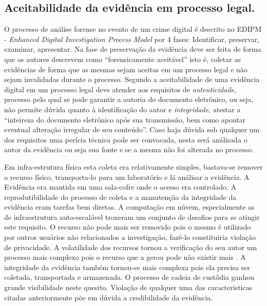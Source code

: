 \subsection{Aceitabilidade da evidência em processo legal.}
\label{sec:credibilidadeaceitabilidadeevidencia}

O processo de análise forense no evento de um crime digital é descrito no EDIPM - \textit{Enhanced Digital Investigation Process Model} por 4 fases: Identificar, preservar, examinar, apresentar. \cite{GrisposChallengesCloudComputing:2012}
%
Na fase de preservação da evidência deve ser feita de forma que os autores descrevem como ``forensicamente aceitável'' isto é, coletar as evidências de forma que as mesmas sejam aceitas em um processo legal e não sejam invalidadas durante o processo.
%
Segundo \cite{Ramos:2011} a aceitabilidade de uma evidência digital em um processo legal deve atender aos requisitos de \textit{autenticidade}, processo pelo qual se pode garantir a autoria do documento eletrônico, ou seja, não permite dúvida quanto à identificação do autor
%
e \textit{integridade}, atestar a “inteireza do documento eletrônico após sua transmissão, bem como apontar eventual alteração irregular de seu conteúdo”.
%
Caso haja dúvida sob qualquer um dos requisitos uma perícia técnica pode ser convocada, nesta será análisada o autor da evidência ou seja sua fonte e se a mesma não foi alterada no processo.


Em infra-estrutura física esta coleta era relativamente simples, bastava-se remover o recurso físico, transporta-lo para um laboratório e lá análisar a evidência. A Evidência era mantida em uma sala-cofre onde o acesso era controlado.
%
A reprodutibilidade do processo de coleta e a manutenção da integridade da evidência eram tarefas bem diretas.
%
A computação em núvem, especialmente as de infraestrutura auto-escalável troxeram um conjunto de desafios para se atingir este requisito. O recurso não pode mais ser removido pois o mesmo é utilizado por outros usuários não relacionados a investigação, fazê-lo constituiria violação de privacidade.
%
A volatilidade dos recursos tornou a verificação do seu autor um processo mais complexo pois o recurso que a gerou pode não existir mais \cite{SimouCloudChlng:2014}.
%
A integridade da evidência também tornou-se mais complexa pois ela precisa ser coletada, transportada e armazenada. O processo de cadeia de custôdia ganhou grande visibilidade neste quesito.
%
Violação de qualquer uma das caracteristicas citadas anteriormente põe em dúvida a credibilidade da evidência.

